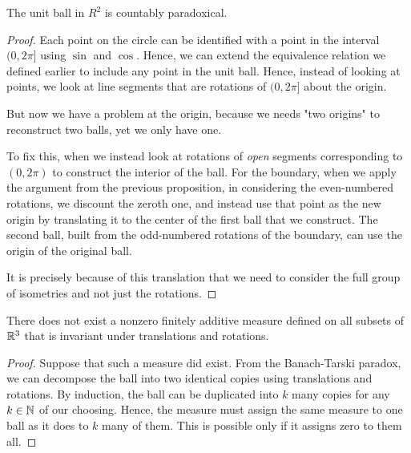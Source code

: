 \documentclass[11pt]{article}
\begin{document}
\begin{cor}
    The unit ball in $R^2$ is countably paradoxical.
\end{cor}

\begin{proof}
    Each point on the circle can be identified with a point in the interval
    $(0, 2\pi]$ using $\sin$ and $\cos$. Hence, we can extend the equivalence
    relation we defined earlier to include any point in the unit ball.
    Hence, instead of looking at points, we look at line segments that are
    rotations of $(0, 2\pi]$ about the origin.

    But now we have a problem at the origin, because we needs "two origins" to
    reconstruct two balls, yet we only have one.

    To fix this, when we instead look at rotations of \emph{open} segments
    corresponding to $(0, 2\pi)$ to construct the interior of the ball. For the
    boundary, when we apply the argument from the previous proposition, in
    considering the even-numbered rotations, we discount the zeroth one, and
    instead use that point as the new origin by translating it to the center of
    the first ball that we construct. The second ball, built from the
    odd-numbered rotations of the boundary, can use the origin of the original
    ball.

    It is precisely because of this translation that we need to consider the
    full group of isometries and not just the rotations.
\end{proof}

\begin{prop}
    There does not exist a nonzero finitely additive measure defined on all
    subsets of $\mathbb{R}^3$ that is invariant under translations and rotations.
\end{prop}

\begin{proof}
    Suppose that such a measure did exist. From the Banach-Tarski paradox, we
    can decompose the ball into two identical copies using translations and
    rotations. By induction, the ball can be duplicated into $k$ many copies
    for any $k \in \mathbb{N}$ of our choosing. Hence, the measure must assign the same
    measure to one ball as it does to $k$ many of them. This is possible only
    if it assigns zero to them all.
\end{proof}
\end{document}
